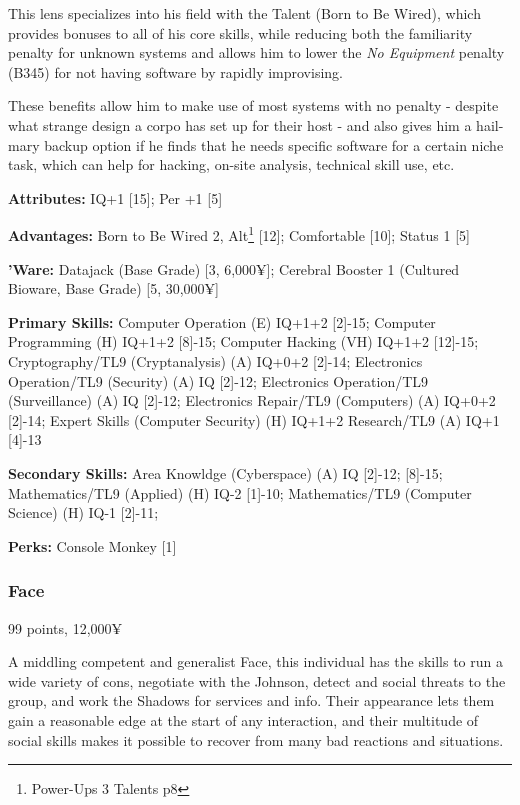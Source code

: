 \begin{multicols*}{2}
	This lens specializes into his field with the Talent (Born to Be Wired), which provides bonuses to all of his core skills, while reducing both the familiarity penalty for unknown systems and allows him to lower the \textit{No Equipment} penalty (B345) for not having software by rapidly improvising. 
	
	These benefits allow him to make use of most systems with no penalty - despite what strange design a corpo has set up for their host - and also gives him a hail-mary backup option if he finds that he needs specific software for a certain niche task, which can help for hacking, on-site analysis, technical skill use, etc.
	
	\textbf{Attributes:}
	IQ+1 [15]; Per +1 [5]
	
	\textbf{Advantages:}
	Born to Be Wired 2, Alt\footnote{Power-Ups 3 Talents p8} [12]; Comfortable [10]; Status 1 [5]
	
	\textbf{'Ware:}
	Datajack (Base Grade) [3, 6,000¥]; Cerebral Booster 1 (Cultured Bioware, Base Grade) [5, 30,000¥]
	
	\textbf{Primary Skills:}
	Computer Operation (E) IQ+1+2 [2]-15; Computer Programming (H) IQ+1+2 [8]-15; Computer Hacking (VH) IQ+1+2 [12]-15; Cryptography/TL9 (Cryptanalysis) (A) IQ+0+2 [2]-14; Electronics Operation/TL9 (Security) (A) IQ [2]-12; Electronics Operation/TL9 (Surveillance) (A) IQ [2]-12; Electronics Repair/TL9 (Computers) (A) IQ+0+2 [2]-14; Expert Skills (Computer Security) (H) IQ+1+2  Research/TL9 (A) IQ+1 [4]-13
	
	\textbf{Secondary Skills:}
	Area Knowldge (Cyberspace) (A) IQ [2]-12; [8]-15; Mathematics/TL9 (Applied) (H) IQ-2 [1]-10; Mathematics/TL9 (Computer Science) (H) IQ-1 [2]-11;
	
	\textbf{Perks:}
	Console Monkey [1]
	
	\subsubsection{Face}
	\begin{flushright}
		99 points, 12,000¥
	\end{flushright}
	
	A middling competent and generalist Face, this individual has the skills to run a wide variety of cons, negotiate with the Johnson, detect and social threats to the group, and work the Shadows for services and info. Their appearance lets them gain a reasonable edge at the start of any interaction, and their multitude of social skills makes it possible to recover from many bad reactions and situations.
	

\end{multicols*}
